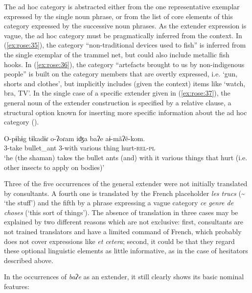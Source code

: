 \documentclass[output=paper]{langscibook}
\begin{document}
The ad hoc category is abstracted either from the one representative exemplar expressed by the single noun phrase, or from the list of core elements of this category expressed by the successive noun phrases. As the extender expression is vague, the ad hoc category must be pragmatically inferred from the context. In (\ref{ex:rose:35}), the category “non-traditional devices used to fish” is inferred from the single exemplar of the trammel net, but could also include metallic fish hooks. In (\ref{ex:rose:36}), the category “artefacts brought to us by non-indigenous people” is built on the category members that are overtly expressed, i.e. ‘gun, shorts and clothes’, but implicitly includes (given the context) items like ‘watch, bra, TV’. In the single case of a specific extender given in (\ref{ex:rose:37}), the general noun of the extender construction is specified by a relative clause, a structural option known for inserting more specific information about the ad hoc category (\citealt[40]{OverstreetOverstreet2021}).


\ea \label{ex:rose:37}
\gll O-pɨhɨg  tɨkadɨɾ  o-ʔoɾam  iʤa  baʔe   aɨ-mãʔẽ-kom.\\
3-take  bullet\_ant  3-with  various  thing  hurt-\textsc{rel-pl}  \\
\glt ‘he (the shaman) takes the bullet ants (and) with it various things that hurt (i.e. other insects to apply on bodies)’ 
\z 

Three of the five occurrences of the general extender were not initially translated by consultants. A fourth one is translated by the French placeholder \textit{les trucs} ({\textasciitilde} ‘the stuff’) and the fifth by a phrase expressing a vague category \textit{ce genre de choses} (‘this sort of things’). The absence of translation in three cases may be explained by two different reasons which are not exclusive: first, consultants are not trained translators and have a limited command of French, which probably does not cover expressions like \textit{et cetera}; second, it could be that they regard these optional linguistic elements as little informative, as in the case of hesitators described above.

In the occurrences of \textit{baʔe} as an extender, it still clearly shows its basic nominal features: 
\end{document}
